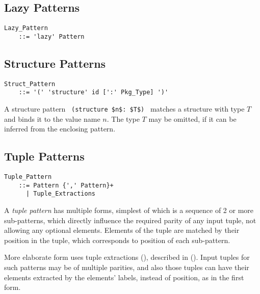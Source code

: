\subsection{Lazy Patterns}
\label{sec:lazy-patterns}

\grammar\begin{lstlisting}
Lazy_Pattern 
    ::= 'lazy' Pattern
\end{lstlisting}





\subsection{Structure Patterns}
\label{sec:structure-patterns}

\grammar\begin{lstlisting}
Struct_Pattern 
    ::= '(' 'structure' id [':' Pkg_Type] ')'
\end{lstlisting}

A structure pattern ~\lstinline!(structure $n$: $T$)!~ matches a structure with type $T$ and binds it to the value name $n$. The type $T$ may be omitted, if it can be inferred from the enclosing pattern. 










\subsection{Tuple Patterns}
\label{sec:tuple-patterns}

\grammar\begin{lstlisting}
Tuple_Pattern 
    ::= Pattern {',' Pattern}+
      | Tuple_Extractions
\end{lstlisting}

A {\em tuple pattern} has multiple forms, simplest of which is a sequence of 2 or more sub-patterns, which directly influence the required parity of any input tuple, not allowing any optional elements. Elements of the tuple are matched by their position in the tuple, which corresponds to position of each sub-pattern. 

More elaborate form uses tuple extractions (), described in (). Input tuples for such patterns may be of multiple parities, and also those tuples can have their elements extracted by the elements' labels, instead of position, as in the first form. 

